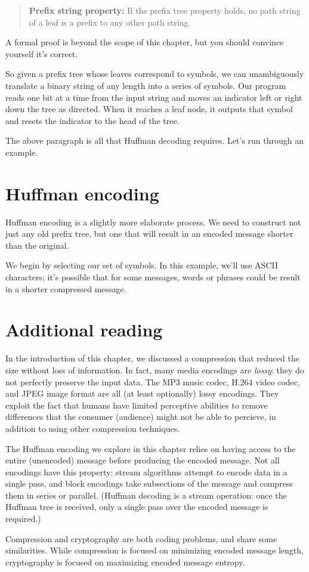 \begin{quotation}
\textbf{Prefix string property:} If the prefix tree property holds, no path string of a leaf is a prefix to any other path string.
\end{quotation}

A formal proof is beyond the scope of this chapter, but you should convince yourself it's correct.

So given a prefix tree whose leaves correspond to symbols, we can unambiguously translate a binary string of any length into a series of symbols. Our program reads one bit at a time from the input string and moves an indicator left or right down the tree as directed. When it reaches a leaf node, it outputs that symbol and resets the indicator to the head of the tree.

The above paragraph is all that Huffman decoding requires. Let's run through an example.


\section{Huffman encoding}

Huffman encoding is a slightly more elaborate process. We need to construct not just any old prefix tree, but one that will result in an encoded message shorter than the original.

We begin by selecting our set of symbols. In this example, we'll use ASCII characters; it's possible that for some messages, words or phrases could be result in a shorter compressed message.


\section{Additional reading}

In the introduction of this chapter, we discussed a compression that reduced the size without loss of information. In fact, many media encodings are \textit{lossy}: they do not perfectly preserve the input data. The MP3 music codec, H.264 video codec, and JPEG image format are all (at least optionally) lossy encodings. They exploit the fact that humans have limited perceptive abilities to remove differences that the consumer (audience) might not be able to percieve, in addition to using other compression techniques.

The Huffman encoding we explore in this chapter relies on having access to the entire (unencoded) message before producing the encoded message. Not all encodings have this property: stream algorithms attempt to encode data in a single pass, and block encodings take subsections of the message and compress them in series or parallel. (Huffman decoding is a stream operation: once the Huffman tree is received, only a single pass over the encoded message is required.)

Compression and cryptography are both coding problems, and share some similarities. While compression is focused on minimizing encoded message length, cryptography is focused on maximizing encoded message entropy.
